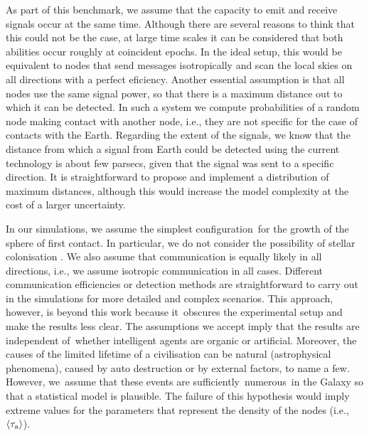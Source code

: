 \documentclass[crop]{CSLB}
\newcommand{\cetis}{nodes}
\begin{document}
As part of this benchmark, we assume that the capacity to emit and receive
signals occur at the same time.
%
Although there are several reasons to think that this could not be the case, at
large time scales it can be considered that both abilities occur roughly at
coincident epochs.
%
In the ideal setup, this would be equivalent to nodes that send messages
isotropically and scan the local skies on all directions with a perfect
eficiency.
%
Another essential assumption is that all \cetis{} use the same signal power, so
that there is a maximum distance out to which it can be detected.
%
In such a system we compute probabilities of a random node making contact with
another node, i.e., they are not specific for the case of contacts with the
Earth.
%
Regarding the extent of the signals, we know that the distance from which a
signal from Earth could be detected using the current technology is about few
parsecs, given that the signal was sent to a specific direction.
%
It is straightforward to propose and implement a distribution of maximum
distances, although this would increase the model complexity at the cost of a
larger uncertainty.



In our simulations, we assume the simplest configuration for the
growth of the sphere of first contact.
%
In particular, we do not consider the
possibility of stellar colonisation
\citep[e.g.][]{newman_galactic_1981, walters_interstellar_1980,
starling_virulence_2013, barlow_galactic_2012, jeong_large_2000,
maccone_mathematical_2011}.
%
We also assume that communication is
equally likely in all directions, i.e., we assume isotropic
communication in all cases.
%
Different communication efficiencies or
detection methods are straightforward to carry out in the simulations
for more detailed and complex scenarios.
%
This approach, however, is
beyond this work because it obscures the experimental setup and make
the results less clear.
%
The assumptions we accept imply that the
results are independent of whether intelligent agents are organic or
artificial.
%
Moreover, the causes of the limited lifetime of a
civilisation can be natural (astrophysical phenomena), caused by auto
destruction or by external factors, to name a few.
%
However, we assume
that these events are sufficiently numerous in the Galaxy so that a
statistical model is plausible. The failure of this hypothesis would
imply extreme values for the parameters that represent the density of
the nodes (i.e., $\left< \tau_{\rm a} \right>$).
\end{document}
